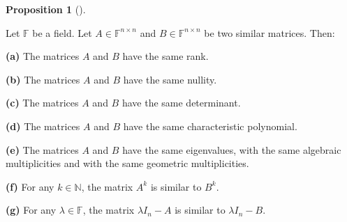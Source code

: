\documentclass[numbers=enddot,12pt,final,onecolumn,notitlepage]{scrartcl}%
\numberwithin{exer}{subsection}
\theoremstyle{definition}
\newtheorem{prop}[theo]{Proposition}
\newenvironment{proposition}[1][]
{\begin{prop}[#1]\begin{leftbar}}
{\end{leftbar}\end{prop}}
\begin{document}
\begin{proposition}
\label{prop.schurtri.similar.same}Let $\mathbb{F}$ be a field. Let
$A\in\mathbb{F}^{n\times n}$ and $B\in\mathbb{F}^{n\times n}$ be two similar
matrices. Then: \medskip

\textbf{(a)} The matrices $A$ and $B$ have the same rank. \medskip

\textbf{(b)} The matrices $A$ and $B$ have the same nullity. \medskip

\textbf{(c)} The matrices $A$ and $B$ have the same determinant. \medskip

\textbf{(d)} The matrices $A$ and $B$ have the same characteristic polynomial.
\medskip

\textbf{(e)} The matrices $A$ and $B$ have the same eigenvalues, with the same
algebraic multiplicities and with the same geometric multiplicities. \medskip

\textbf{(f)} For any $k\in\mathbb{N}$, the matrix $A^{k}$ is similar to
$B^{k}$. \medskip

\textbf{(g)} For any $\lambda\in\mathbb{F}$, the matrix $\lambda I_{n}-A$ is
similar to $\lambda I_{n}-B$.
\end{proposition}
\end{document}

